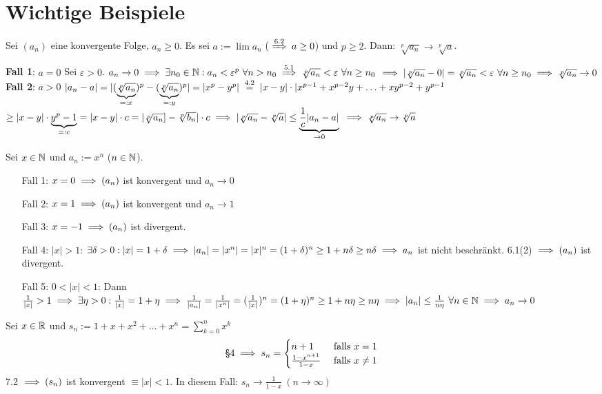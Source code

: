 \documentclass[a4paper,twoside,DIV15,BCOR12mm]{scrbook}
\begin{document}
\chapter{Wichtige Beispiele}

\begin{satz}
Sei $(a_n)$ eine konvergente Folge, $a_n\ge0$. Es sei $a := \lim a_n$ ($\displaystyle\folgtnach{6.2} a \ge 0$) und $p \ge 2$. Dann: $\sqrt[p]{a_n} \to \sqrt[p]{a}$.
\end{satz}

\begin{beweis}
\textbf{Fall 1}: $a=0$ Sei $\varepsilon >0$.
$a_n\to0 \folgt \exists n_0 \in \MdN: a_n < \varepsilon^p \ \forall n >n_0 \folgtnach{5.1} \sqrt[p]{a_n} < \varepsilon \ \forall n \ge n_0 $
$\implies |\sqrt[p]{a_n} - 0| = \sqrt[p]{a_n} < \varepsilon \ \forall n \ge n_0 \implies \sqrt[p]{a_n} \to 0$\\
\textbf{Fall 2}: $a>0$
$ |a_n - a| = |(\underbrace{\sqrt[p]{a_n}}_{=: x})^p - (\underbrace{\sqrt[p]{a_n}}_{=: y})^p| = |x^p - y^p| \gleichnach{4.2} |x - y| \cdot |x^{p-1} + x^{p-2}y + \ldots + xy^{p-2} + y^{p-1}$
$\ge |x-y| \cdot \underbrace{y^p-1}_{=: c} = |x-y|\cdot c = |\sqrt[p]{a_n}] - \sqrt[p]{b_n}|\cdot c \implies |\sqrt[p]{a_n} - \sqrt[p]{a}| \le \underbrace{\frac{1}{c}|a_n-a|}_{\to 0} $
$ \implies \sqrt[p]{a_n} \to \sqrt[p]{a} $
\end{beweis}

\begin{wichtigesbeispiel}
Sei $x\in\mathbb{N}$ und $a_n := x^n$ ($n\in\mathbb{N}$).
\begin{itemize}
\item[Fall 1:] $x=0 \implies (a_n)$ ist konvergent und $a_n \to 0$
\item[Fall 2:] $x=1 \implies (a_n)$ ist konvergent und $a_n \to 1$
\item[Fall 3:] $x=-1 \implies (a_n)$ ist divergent.
\item[Fall 4:] $|x| > 1$: $\exists \delta > 0 : |x| = 1+\delta \implies |a_n| = |x^n| = |x|^n = (1+\delta)^n \ge 1+n\delta \ge n\delta \implies a_n$ ist nicht beschränkt. 6.1(2) $\implies (a_n)$ ist divergent.
\item[Fall 5:] $0 <|x|<1$: Dann $\frac{1}{|x|} > 1 \implies \exists \eta>0: \frac{1}{|x|} = 1+\eta \implies \frac{1}{|a_n|} = \frac{1}{|x^n|} = (\frac{1}{|x|})^n = (1+\eta)^n \ge 1+n\eta \ge n\eta \implies |a_n| \le \frac{1}{n\eta} \ \forall n\in\mathbb{N} \implies a_n \to 0$
\end{itemize}
\end{wichtigesbeispiel}
\begin{wichtigesbeispiel}
\item Sei $x\in\mathbb{R}$ und $s_n := 1+x+x^2+\ldots+x^n=\displaystyle\sum_{k=0}^n x^k$
$$ \text{§4} \implies s_n=\begin{cases}n+1 & \text{ falls }x=1 \\ \frac{1-x^{n+1}}{1-x} & \text{ falls }x\ne 1\end{cases} $$
7.2 $\implies (s_n)$ ist konvergent $\equiv |x| < 1$. In diesem Fall: $s_n \to \frac{1}{1-x}\ (n \to \infty)$
\end{wichtigesbeispiel}
\end{document}
